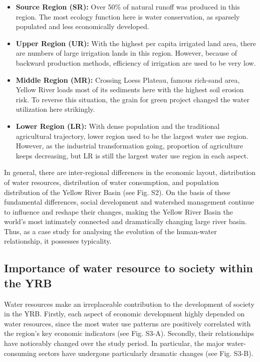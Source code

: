 \documentclass[9pt,twoside,lineno]{pnas-new}
\begin{document}
\begin{itemize}
    \item \textbf{Source Region (SR):} Over 50\% of natural runoff was produced in this region. The most ecology function here is water conservation, as sparsely populated and less economically developed.
    \item \textbf{Upper Region (UR):} With the highest per capita irrigated land area, there are numbers of large irrigation lands in this region. However, because of backward production methods, efficiency of irrigation are used to be very low.
    \item \textbf{Middle Region (MR):} Crossing Loess Plateau, famous rich-sand area, Yellow River loads most of its sediments here with the highest soil erosion risk. To reverse this situation, the grain for green project changed the water utilization here strikingly.
    \item \textbf{Lower Region (LR):} With dense population and the traditional agricultural trajectory, lower region used to be the largest water use region. However, as the industrial transformation going, proportion of agriculture keeps decreasing, but LR is still the largest water use region in each aspect.
\end{itemize}

In general, there are inter-regional differences in the economic layout, distribution of water resources, distribution of water consumption, and population distribution of the Yellow River Basin (see Fig. S2). On the basis of these fundamental differences, social development and watershed management continue to influence and reshape their changes, making the Yellow River Basin the world's most intimately connected and dramatically changing large river basin. Thus, as a case study for analysing the evolution of the human-water relationship, it possesses typicality.

\subsection*{Importance of water resource to society within the YRB}
Water resources make an irreplaceable contribution to the development of society in the YRB. Firstly, each aspect of economic development highly depended on water resources, since the most water use patterns are positively correlated with the region's key economic indicators (see Fig. S3-A). Secondly, their relationships have noticeably changed over the study period. In particular, the major water-consuming sectors have undergone particularly dramatic changes (see Fig. S3-B). 
\end{document}
